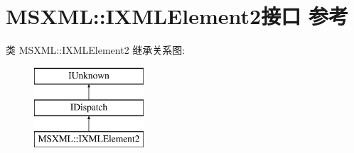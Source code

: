 \hypertarget{interface_m_s_x_m_l_1_1_i_x_m_l_element2}{}\section{M\+S\+X\+ML\+:\+:I\+X\+M\+L\+Element2接口 参考}
\label{interface_m_s_x_m_l_1_1_i_x_m_l_element2}
类 M\+S\+X\+ML\+:\+:I\+X\+M\+L\+Element2 继承关系图\+:\begin{figure}[H]
\begin{center}
\leavevmode
\includegraphics[height=3.000000cm]{interface_m_s_x_m_l_1_1_i_x_m_l_element2}
\end{center}
\end{figure}
